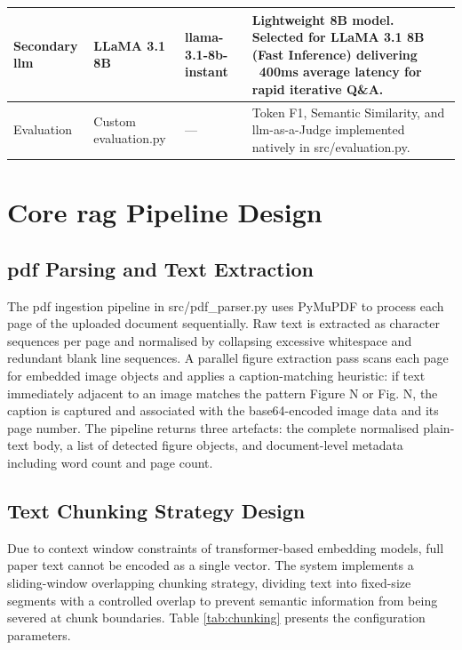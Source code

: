 \begin{table}[H]
\begin{tabular}{|p{2.5cm}|p{2.5cm}|p{1.5cm}|p{6cm}|}
\hline

Secondary \gls{llm} & LLaMA 3.1 8B & llama-3.1-8b-instant & Lightweight 8B model. Selected for LLaMA 3.1 8B (Fast Inference) delivering ~400ms average latency for rapid iterative Q\&A. \\

\hline

Evaluation & Custom evaluation.py & — & Token F1, Semantic Similarity, and \gls{llm}-as-a-Judge implemented natively in src/evaluation.py. \\

\hline

\end{tabular}

\end{table}

\section{Core \gls{rag} Pipeline Design}

\subsection{\gls{pdf} Parsing and Text Extraction}

The \gls{pdf} ingestion pipeline in src/pdf\_parser.py uses PyMuPDF to process each page of the uploaded document sequentially. Raw text is extracted as character sequences per page and normalised by collapsing excessive whitespace and redundant blank line sequences. A parallel figure extraction pass scans each page for embedded image objects and applies a caption-matching heuristic: if text immediately adjacent to an image matches the pattern Figure N or Fig. N, the caption is captured and associated with the base64-encoded image data and its page number. The pipeline returns three artefacts: the complete normalised plain-text body, a list of detected figure objects, and document-level metadata including word count and page count.

\subsection{Text Chunking Strategy Design}

Due to context window constraints of transformer-based embedding models, full paper text cannot be encoded as a single vector. The system implements a sliding-window overlapping chunking strategy, dividing text into fixed-size segments with a controlled overlap to prevent semantic information from being severed at chunk boundaries. Table \ref{tab:chunking} presents the configuration parameters.

